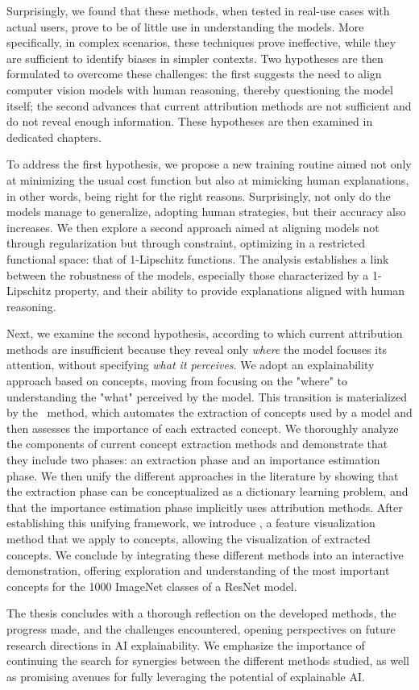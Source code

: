 Surprisingly, we found that these methods, when tested in real-use cases with actual users, prove to be of little use in understanding the models. More specifically, in complex scenarios, these techniques prove ineffective, while they are sufficient to identify biases in simpler contexts. Two hypotheses are then formulated to overcome these challenges: the first suggests the need to align computer vision models with human reasoning, thereby questioning the model itself; the second advances that current attribution methods are not sufficient and do not reveal enough information. These hypotheses are then examined in dedicated chapters.

To address the first hypothesis, we propose a new training routine aimed not only at minimizing the usual cost function but also at mimicking human explanations, in other words, being right for the right reasons. Surprisingly, not only do the models manage to generalize, adopting human strategies, but their accuracy also increases. We then explore a second approach aimed at aligning models not through regularization but through constraint, optimizing in a restricted functional space: that of 1-Lipschitz functions. The analysis establishes a link between the robustness of the models, especially those characterized by a 1-Lipschitz property, and their ability to provide explanations aligned with human reasoning.

Next, we examine the second hypothesis, according to which current attribution methods are insufficient because they reveal only \textit{where} the model focuses its attention, without specifying \textit{what it perceives}. We adopt an explainability approach based on concepts, moving from focusing on the "where" to understanding the "what" perceived by the model. This transition is materialized by the \craft~method, which automates the extraction of concepts used by a model and then assesses the importance of each extracted concept. We thoroughly analyze the components of current concept extraction methods and demonstrate that they include two phases: an extraction phase and an importance estimation phase. We then unify the different approaches in the literature by showing that the extraction phase can be conceptualized as a dictionary learning problem, and that the importance estimation phase implicitly uses attribution methods. After establishing this unifying framework, we introduce \maco, a feature visualization method that we apply to concepts, allowing the visualization of extracted concepts. We conclude by integrating these different methods into an interactive demonstration, offering exploration and understanding of the most important concepts for the 1000 ImageNet classes of a ResNet model.

The thesis concludes with a thorough reflection on the developed methods, the progress made, and the challenges encountered, opening perspectives on future research directions in AI explainability. We emphasize the importance of continuing the search for synergies between the different methods studied, as well as promising avenues for fully leveraging the potential of explainable AI.





